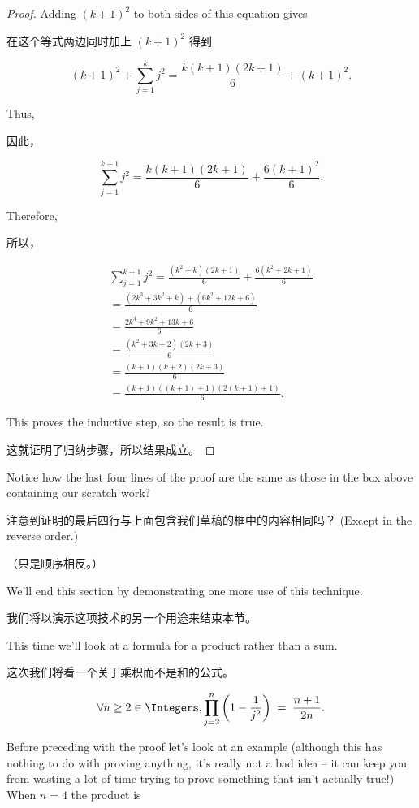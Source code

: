 \begin{proof}
Adding $(k+1)^2$ to both sides of this equation gives

在这个等式两边同时加上 $(k+1)^2$ 得到

\[ (k+1)^2 + \sum_{j=1}^k j^2 = \frac{k(k+1)(2k+1)}{6} + (k+1)^2.
\]

Thus,

因此，

\[ \sum_{j=1}^{k+1} j^2 = \frac{k(k+1)(2k+1)}{6} + \frac{6(k+1)^2}{6}. \]

Therefore,

所以，

\begin{gather*}
\sum_{j=1}^{k+1} j^2 = \frac{(k^2+k)(2k+1)}{6} + \frac{6(k^2+2k+1)}{6} \\
 = \frac{(2k^3+3k^2+k)+(6k^2+12k+6)}{6}\\
 = \frac{2k^3+9k^2+13k+6}{6}\\
 = \frac{(k^2+3k+2)(2k+3)}{6}\\
 = \frac{(k+1)(k+2)(2k+3)}{6} \\
 = \frac{(k+1)((k+1)+1)(2(k+1)+1)}{6}.
\end{gather*}

This proves the inductive step, so the result is true.

这就证明了归纳步骤，所以结果成立。
\end{proof}

Notice how the last four lines of the proof are the same as those in
the box above containing our scratch work?

注意到证明的最后四行与上面包含我们草稿的框中的内容相同吗？
(Except in the reverse order.)

（只是顺序相反。）

We'll end this section by demonstrating one more use of this technique.

我们将以演示这项技术的另一个用途来结束本节。

This time we'll look at a formula for a product rather than a sum.

这次我们将看一个关于乘积而不是和的公式。
\begin{thm} $$\forall n \geq 2 \in \Integers, \prod_{j=2}^n \left( 1 - \frac{1}{j^2} \right) \;  = \; \frac{n+1}{2n}.$$
\end{thm}

Before preceding with the proof let's look at an example (although this 
has nothing to do with proving anything, it's really not a bad idea -- it can
keep you from wasting a lot of time trying to prove something that isn't 
actually true!)  When $n = 4$ the product is

